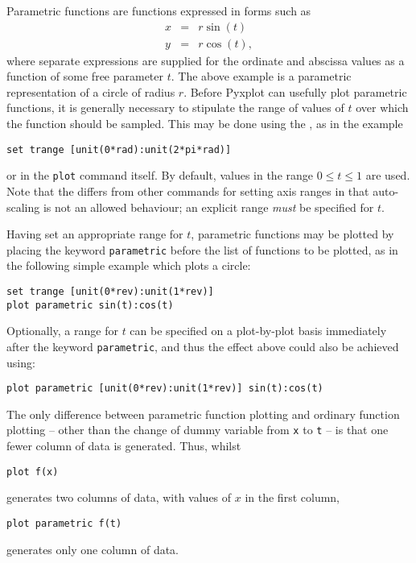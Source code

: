 Parametric functions are functions expressed in forms such as
\begin{eqnarray*}
x & = & r \sin(t)  \\
y & = & r \cos(t) ,
\end{eqnarray*}
where separate expressions are supplied for the ordinate and abscissa values as
a function of some free parameter $t$. The above example is a parametric
representation of a circle of radius $r$. Before Pyxplot can usefully plot
parametric functions, it is generally necessary to stipulate the range of
values of $t$ over which the function should be sampled. This may be done using
the , as in the example
\begin{verbatim}
set trange [unit(0*rad):unit(2*pi*rad)]
\end{verbatim}
or in the {\tt plot} command itself. By default, values in the range $0\leq
t\leq1$ are used. Note that the  differs from other
commands for setting axis ranges in that auto-scaling is not an allowed
behaviour; an explicit range {\it must} be specified for $t$.

Having set an appropriate range for $t$, parametric functions may be plotted by
placing the keyword {\tt parametric} before the list of functions to be
plotted, as in the following simple example which plots a circle:
\begin{verbatim}
set trange [unit(0*rev):unit(1*rev)]
plot parametric sin(t):cos(t)
\end{verbatim}
Optionally, a range for $t$ can be specified on a plot-by-plot basis
immediately after the keyword {\tt parametric}, and thus the effect above could
also be achieved using:
\begin{verbatim}
plot parametric [unit(0*rev):unit(1*rev)] sin(t):cos(t)
\end{verbatim}
The only difference between parametric function plotting and ordinary function
plotting -- other than the change of dummy variable from {\tt x} to {\tt t} --
is that one fewer column of data is generated. Thus, whilst
\begin{verbatim}
plot f(x)
\end{verbatim}
generates two columns of data, with values of $x$ in the first column,
\begin{verbatim}
plot parametric f(t)
\end{verbatim}
generates only one column of data.

